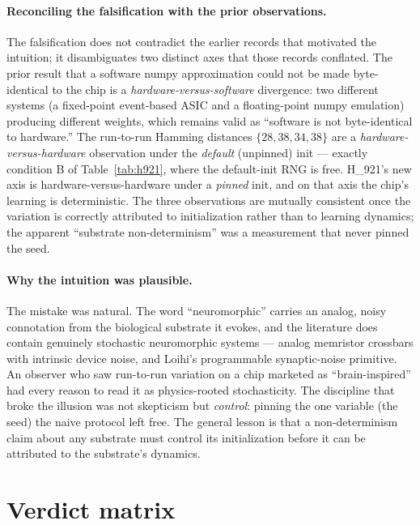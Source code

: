 \documentclass[11pt,a4paper]{article}
\begin{document}
\paragraph{Reconciling the falsification with the prior observations.} The
falsification does not contradict the earlier records that motivated the
intuition; it disambiguates two distinct axes that those records conflated.
The prior result that a software numpy approximation could not be made
byte-identical to the chip is a \emph{hardware-versus-software} divergence:
two different systems (a fixed-point event-based ASIC and a floating-point
numpy emulation) producing different weights, which remains valid as
``software is not byte-identical to hardware.'' The run-to-run Hamming
distances \(\{28,38,34,38\}\) are a \emph{hardware-versus-hardware}
observation under the \emph{default} (unpinned) init --- exactly condition
B of Table~\ref{tab:h921}, where the default-init RNG is free. H\_921's new
axis is hardware-versus-hardware under a \emph{pinned} init, and on that
axis the chip's learning is deterministic. The three observations are
mutually consistent once the variation is correctly attributed to
initialization rather than to learning dynamics; the apparent
``substrate non-determinism'' was a measurement that never pinned the seed.

\paragraph{Why the intuition was plausible.} The mistake was natural. The
word ``neuromorphic'' carries an analog, noisy connotation from the
biological substrate it evokes, and the literature does contain genuinely
stochastic neuromorphic systems --- analog memristor crossbars with
intrinsic device noise, and Loihi's programmable synaptic-noise primitive.
An observer who saw run-to-run variation on a chip marketed as
``brain-inspired'' had every reason to read it as physics-rooted
stochasticity. The discipline that broke the illusion was not skepticism but
\emph{control}: pinning the one variable (the seed) the naive protocol left
free. The general lesson is that a non-determinism claim about any
substrate must control its initialization before it can be attributed to
the substrate's dynamics.

\section{Verdict matrix}
\label{sec:verdicts}
\end{document}
